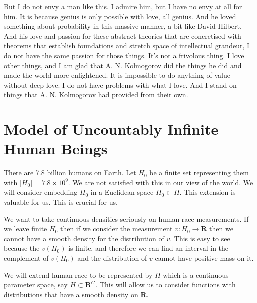 \documentclass{amsart}
\begin{document}
But I do not envy a man like this.  I admire him, but I have no envy at all for him.  It is because genius is only possible with love, all genius.  And he loved something about probability in this massive manner, a bit like David Hilbert.  And his love and passion for these abstract theories that are concretised with theorems that establish foundations and stretch space of intellectual grandeur, I do not have the same passion for those things.  It's not a frivolous thing.  I love other things, and I am glad that A. N. Kolmogorov did the things he did and made the world more enlightened.  It is impossible to do anything of value without deep love.  I do not have problems with what I love.  And I stand on things that A. N. Kolmogorov had provided from their own.

\section{Model of Uncountably Infinite Human Beings}

There are 7.8 billion humans on Earth.  Let $H_0$ be a finite set representing them with $|H_0| = 7.8 \times 10^{9}$.  We are not satisfied with this in our view of the world.  We will consider embedding $H_0$ in a Euclidean space $H_0 \subset H$.  This extension is valuable for us.  This is crucial for us.  

We want to take continuous densities seriously on human race measurements.  If we leave finite $H_0$ then if we consider the measurement $v: H_0 \rightarrow \mathbf{R}$ then we cannot have a smooth density for the distribution of $v$.  This is easy to see because the $v(H_0)$ is finite, and therefore we can find an interval in the complement of $v(H_0)$ and the distribution of $v$ cannot have positive mass on it.  

We will extend human race to be represented by $H$ which is a continuous parameter space, say $H \subset \mathbf{R}^G$.  This will allow us to consider functions with distributions that have a smooth density on $\mathbf{R}$.
\end{document}
